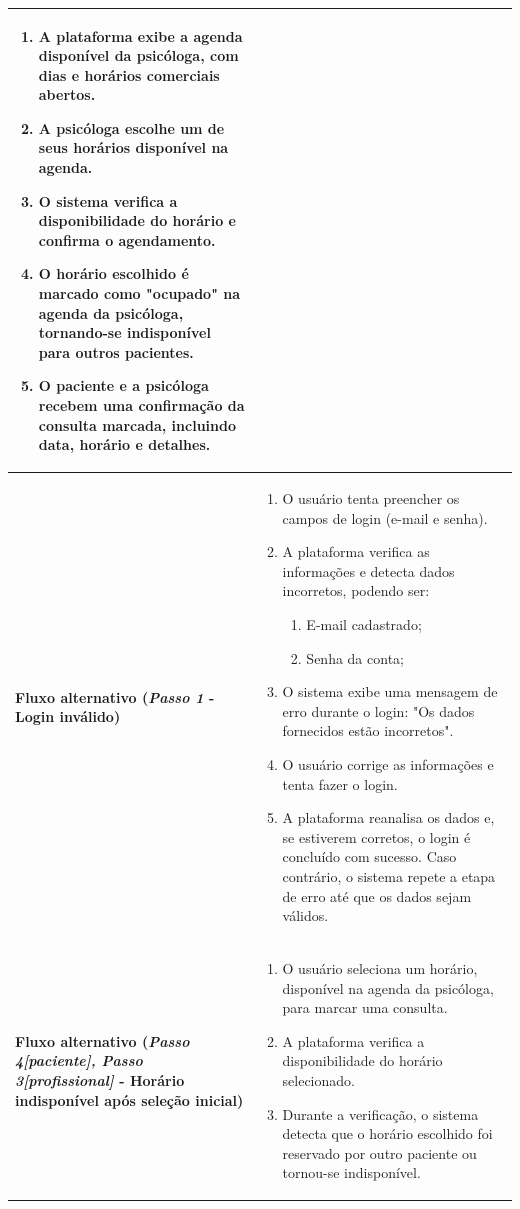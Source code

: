 \documentclass[a4paper,12pt]{report}
\begin{document}
\begin{longtable}{|p{4cm}|p{11.5cm}|}
\begin{enumerate}[left=2mm]
        \item A plataforma exibe a agenda disponível da psicóloga, com dias e horários comerciais abertos.
        \item A psicóloga escolhe um de seus horários disponível na agenda.
        \item O sistema verifica a disponibilidade do horário e confirma o agendamento.
        \item O horário escolhido é marcado como "ocupado" na agenda da psicóloga, tornando-se indisponível para outros pacientes.
        \item O paciente e a psicóloga recebem uma confirmação da consulta marcada, incluindo data, horário e detalhes.
    \end{enumerate} \\ \hline
    \textbf{Fluxo alternativo (\textit{Passo 1} - Login inválido)} & 
    \begin{enumerate}[leftmargin=*,labelsep=1em]
        \item O usuário tenta preencher os campos de login (e-mail e senha).
        \item A plataforma verifica as informações e detecta dados incorretos, podendo ser:
        \begin{enumerate}
            \item E-mail cadastrado;
            \item Senha da conta;
        \end{enumerate}
        \item O sistema exibe uma mensagem de erro durante o login: "Os dados fornecidos estão incorretos".
        \item O usuário corrige as informações e tenta fazer o login.
        \item A plataforma reanalisa os dados e, se estiverem corretos, o login é concluído com sucesso. Caso contrário, o sistema repete a etapa de erro até que os dados sejam válidos.
    \end{enumerate} \\ \hline
    \textbf{Fluxo alternativo (\textit{Passo 4[paciente], Passo 3[profissional]} - Horário indisponível após seleção inicial)} & \begin{enumerate}[left=2mm]
        \item O usuário seleciona um horário, disponível na agenda da psicóloga, para marcar uma consulta.
        \item A plataforma verifica a disponibilidade do horário selecionado.
        \item Durante a verificação, o sistema detecta que o horário escolhido foi reservado por outro paciente ou tornou-se indisponível.

\end{enumerate}
\end{longtable}
\end{document}
